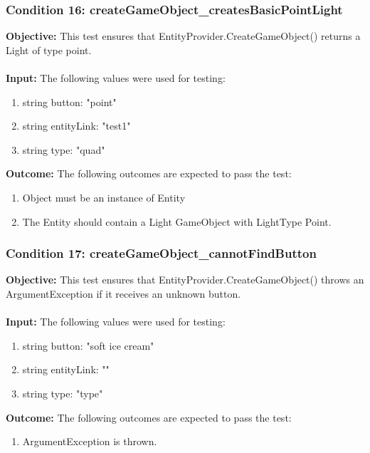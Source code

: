 \documentclass[a4paper,12pt]{article}
\begin{document}
		\subsubsection{Condition 16: createGameObject\_createsBasicPointLight}
			\textbf{Objective:} This test ensures that EntityProvider.CreateGameObject() returns a Light of type point.\\\\
			\textbf{Input:} The following values were used for testing:
				\begin{enumerate}
					\item string button: "point"
					\item string entityLink: "test1"
					\item string type: "quad"
				\end{enumerate}
			\textbf{Outcome:} The following outcomes are expected to pass the test:
				\begin{enumerate}
					\item Object must be an instance of Entity
					\item The Entity should contain a Light GameObject with LightType Point.
				\end{enumerate}
		\subsubsection{Condition 17: createGameObject\_cannotFindButton}
			\textbf{Objective:} This test ensures that EntityProvider.CreateGameObject() throws an ArgumentException if it receives an unknown button.\\\\
			\textbf{Input:} The following values were used for testing:
				\begin{enumerate}
					\item string button: "soft ice cream"
					\item string entityLink: ""
					\item string type: "type"
				\end{enumerate}
			\textbf{Outcome:} The following outcomes are expected to pass the test:
				\begin{enumerate}
					\item ArgumentException is thrown.
				\end{enumerate}
\end{document}
